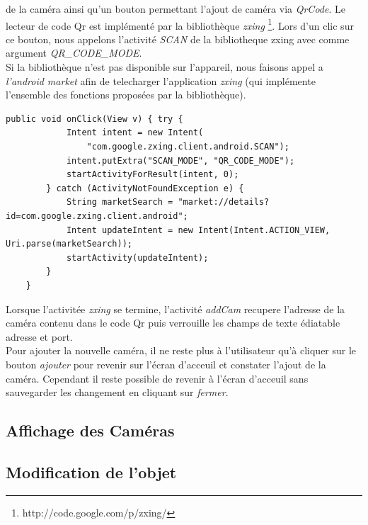 \documentclass[a4paper,10pt]{report}
\begin{document}
de la caméra ainsi qu'un bouton permettant l'ajout de caméra via
\textit{QrCode}.
\indent Le lecteur de code Qr est implémenté par la bibliothèque
\textit{zxing} \footnote{\label{zxing} http://code.google.com/p/zxing/}. \newline
Lors d'un clic sur ce bouton, nous appelons l'activité 
\textit{SCAN} de la bibliotheque zxing avec comme argument
\textit{QR\_CODE\_MODE}.\\
Si la bibliothèque n'est pas disponible sur l'appareil, nous faisons appel a
\textit{l'android market} afin de telecharger l'application \textit{zxing} (qui
implémente l'ensemble des fonctions proposées par la bibliothèque).
\newpage
\begin{lstlisting}[caption={Lancement de l'activité zxing ou de l'android
market}] 
    public void onClick(View v) { try {
            Intent intent = new Intent(
                "com.google.zxing.client.android.SCAN");
            intent.putExtra("SCAN_MODE", "QR_CODE_MODE");
            startActivityForResult(intent, 0);
        } catch (ActivityNotFoundException e) {
            String marketSearch = "market://details?id=com.google.zxing.client.android";
            Intent updateIntent = new Intent(Intent.ACTION_VIEW, Uri.parse(marketSearch));
            startActivity(updateIntent);
        }
    }
\end{lstlisting}
\indent Lorsque l'activitée \textit{zxing} se termine, l'activité
\textit{addCam} recupere l'adresse de la caméra contenu dans le code Qr puis verrouille les
champs de texte édiatable adresse et port.\\
\indent Pour ajouter la nouvelle
caméra, il ne reste plus à l'utilisateur qu'à cliquer sur le bouton \textit{ajouter} pour revenir sur l'écran d'acceuil et constater
l'ajout de la caméra. Cependant il reste possible de revenir à l'écran d'acceuil
sans sauvegarder les changement en cliquant sur \textit{fermer}.

\subsection{Affichage des Caméras}


\subsection{Modification de l'objet}
\end{document}
